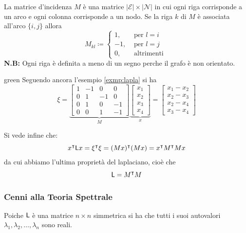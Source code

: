  La matrice d'incidenza $M$ \`e una matrice $|\mathcal{E}| \times |\mathcal{N}|$ in cui ogni riga corrisponde a un arco e ogni colonna corrisponde a un nodo. Se la riga $k$ di $M$ \`e associata all'arco $\{i, j\}$ allora
\begin{equation}
M_{kl} \coloneqq \begin{cases}
1, & \text{ per $l = i$ }\\
-1, & \text{ per $l = j$ }\\
0, & \text{ altrimenti }
\end{cases}
\end{equation}
\textbf{N.B:} Ogni riga \`e definita a meno di un segno perche il grafo \`e non orientato.
\begin{mybox}{green}{}
Seguendo ancora l'esempio \ref{exmp:lapla} si ha
\[
\xi = \underbrace{\begin{bmatrix}
1 & -1 & 0 & 0 \\
0 & 1 & -1 & 0 \\
0 & 1 & 0 & -1 \\
0 & 0 & 1 & -1 
\end{bmatrix}}_{M}
\underbrace{\begin{bmatrix}
x_1 \\
x_2 \\
x_3 \\
x_4
\end{bmatrix}}_{x} = \begin{bmatrix} x_1 - x_2 \\ x_2 - x_3 \\ x_2 - x_4 \\ x_3 - x_4 \end{bmatrix}
\]
\end{mybox}
Si vede infine che:
\begin{equation}
x^\intercal \mathsf{L} x = \xi^\intercal \xi = (Mx)^\intercal(Mx) = x^\intercal M^\intercal M x
\end{equation}
da cui abbiamo l'ultima propriet\`a del laplaciano, cio\`e che
\begin{equation}
    \mathsf{L} = M^\intercal M
\end{equation}

\subsubsection{Cenni alla Teoria Spettrale}
Poiche $\mathsf{L}$ \`e una matrice $n\times n$ simmetrica si ha che tutti i suoi autovalori $\lambda_1, \lambda_2, \dots, \lambda_n$ sono reali.

